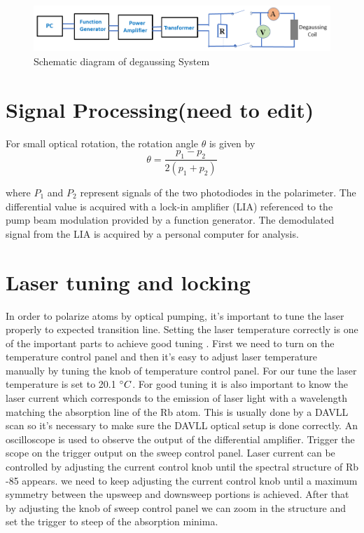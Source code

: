 \begin{figure}[h]
\centering
\includegraphics[width=1.0\linewidth]{figures/degaussing_system}
\caption{Schematic diagram of degaussing System}
\end{figure}

\section{Signal Processing(need to edit)}
For small optical rotation, the rotation angle $\theta$ is given by 
\begin{equation}
\theta=\frac{p_1-p_2}{2(p_1+p_2)}
\end{equation}
       
where $P_1$ and $P_2$ represent signals of the two photodiodes in the polarimeter. The differential value is acquired with a lock-in amplifier (LIA) referenced to the pump beam modulation provided by a function generator. The demodulated signal from the LIA is acquired by a personal computer for analysis. 
\section{Laser tuning and locking}
In order to polarize atoms by optical pumping, it's important to tune the laser properly to expected transition line.
Setting the laser temperature correctly is one of the important parts to achieve good tuning . First we need to turn on the temperature control panel and then it’s easy to adjust laser temperature manually by tuning the knob of temperature control panel. For our tune the laser temperature is set to 20.1 $\degree C$. For good tuning it is also important to know the laser current which corresponds to the emission of laser light with a wavelength matching the absorption line of the Rb atom. This is usually done by a DAVLL scan so it's necessary to make sure the DAVLL optical setup is done correctly. An oscilloscope is used to observe the output of the differential amplifier. Trigger the scope on the trigger output on the sweep control panel.
Laser current can be controlled by adjusting the current control knob until the spectral structure of Rb -85 appears. we need to keep adjusting the current control knob until a maximum symmetry between the upsweep and downsweep portions is achieved. After that by adjusting the knob of sweep control panel we can zoom in the structure and set the trigger to steep of the absorption minima. 


